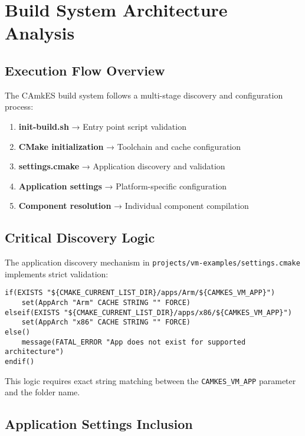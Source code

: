 \documentclass[12pt,a4paper]{article}
\begin{document}
\section{Build System Architecture Analysis}

\subsection{Execution Flow Overview}

The CAmkES build system follows a multi-stage discovery and configuration process:

\begin{enumerate}
\item \textbf{init-build.sh} → Entry point script validation
\item \textbf{CMake initialization} → Toolchain and cache configuration  
\item \textbf{settings.cmake} → Application discovery and validation
\item \textbf{Application settings} → Platform-specific configuration
\item \textbf{Component resolution} → Individual component compilation
\end{enumerate}

\subsection{Critical Discovery Logic}

The application discovery mechanism in \texttt{projects/vm-examples/settings.cmake} implements strict validation:

\begin{lstlisting}[style=cmake, caption=Application existence validation]
if(EXISTS "${CMAKE_CURRENT_LIST_DIR}/apps/Arm/${CAMKES_VM_APP}")
    set(AppArch "Arm" CACHE STRING "" FORCE)
elseif(EXISTS "${CMAKE_CURRENT_LIST_DIR}/apps/x86/${CAMKES_VM_APP}")
    set(AppArch "x86" CACHE STRING "" FORCE)
else()
    message(FATAL_ERROR "App does not exist for supported architecture")
endif()
\end{lstlisting}

This logic requires exact string matching between the \texttt{CAMKES\_VM\_APP} parameter and the folder name.

\subsection{Application Settings Inclusion}
\end{document}

